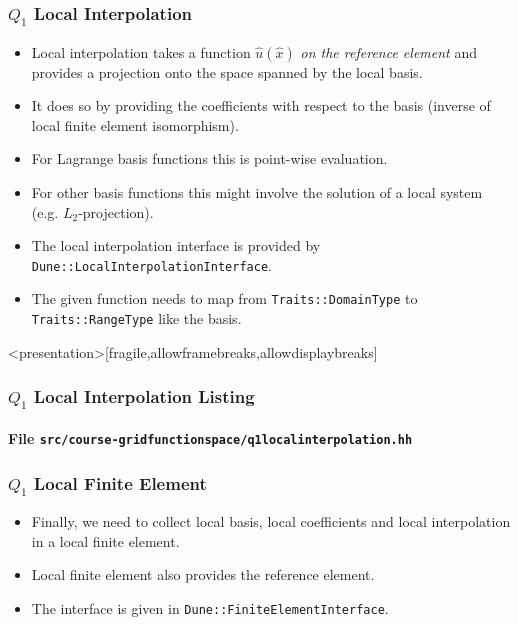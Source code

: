 \begin{frame}
\frametitle{$Q_1$ Local Interpolation}
\begin{itemize}
\item Local interpolation takes a function $\hat{u}(\hat{x})$ \textit{on the
reference element} and provides a projection onto the space spanned by
the local basis.
\item It does so by providing the coefficients with respect to the basis 
(inverse of local finite element isomorphism).
\item For Lagrange basis functions this is point-wise evaluation.
\item For other basis functions this might involve the solution of a local
system (e.g. $L_2$-projection).
\item The local interpolation interface is provided by
\lstinline{Dune::LocalInterpolationInterface}.
\item The given function needs to map from \lstinline{Traits::DomainType}
to \lstinline{Traits::RangeType} like the basis.
\end{itemize}
\end{frame}


\begin{frame}<presentation>[fragile,allowframebreaks,allowdisplaybreaks]
\frametitle<presentation>{$Q_1$ Local Interpolation Listing}
\framesubtitle<presentation>{File \texttt{src/course-gridfunctionspace/q1localinterpolation.hh}}

\end{frame}

\begin{frame}
\frametitle{$Q_1$ Local Finite Element}
\begin{itemize}
\item Finally, we need to collect local basis, local coefficients and local
interpolation in a local finite element.

\item Local finite element also provides the reference element.

\item The interface is given
in \lstinline{Dune::FiniteElementInterface}.

\end{itemize}
\end{frame}

